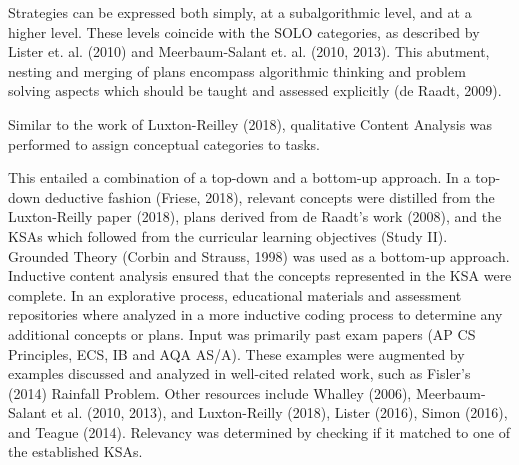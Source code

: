 


 Strategies can be expressed both simply, at a subalgorithmic level, and at a higher level. These levels coincide with the SOLO categories, as described by Lister et. al. (2010) and Meerbaum-Salant et. al. (2010, 2013). This abutment, nesting and merging of plans encompass algorithmic thinking and problem solving aspects which should be taught and assessed explicitly (de Raadt, 2009).




Similar to the work of Luxton-Reilley (2018), qualitative Content Analysis was performed to assign conceptual categories to tasks.




This entailed a combination of a top-down and a bottom-up approach. In a top-down deductive fashion (Friese, 2018), relevant concepts were distilled from the Luxton-Reilly paper (2018), plans derived from de Raadt's work (2008), and the KSAs which followed from the curricular learning objectives (Study II). Grounded Theory (Corbin and Strauss, 1998) was used as a bottom-up approach. Inductive content analysis ensured that the concepts represented in the KSA were complete. In an explorative process, educational materials and assessment repositories where analyzed in a more inductive coding process to determine any additional concepts or plans. Input was primarily past exam papers (AP CS Principles, ECS, IB and AQA AS/A). These examples were augmented by examples discussed and analyzed in well-cited related work, such as Fisler's (2014) Rainfall Problem. Other resources include Whalley (2006), Meerbaum-Salant et al. (2010, 2013), and Luxton-Reilly (2018), Lister (2016), Simon (2016), and Teague (2014). Relevancy was determined by checking if it matched to one of the established KSAs.%

